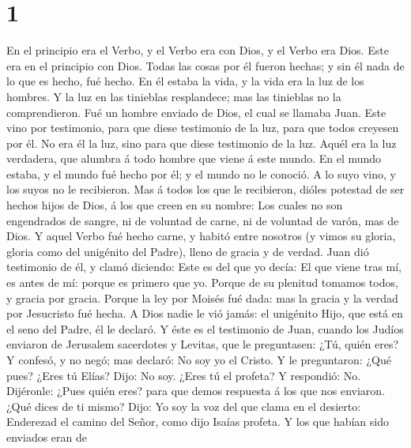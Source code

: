 \hypertarget{section}{%
\section{1}\label{section}}

 En el principio era el Verbo, y el Verbo era con Dios, y
el Verbo era Dios.  Este era en el principio con Dios.
 Todas las cosas por él fueron hechas; y sin él nada de lo
que es hecho, fué hecho.  En él estaba la vida, y la vida
era la luz de los hombres.  Y la luz en las tinieblas
resplandece; mas las tinieblas no la comprendieron.  Fué
un hombre enviado de Dios, el cual se llamaba Juan.  Este
vino por testimonio, para que diese testimonio de la luz, para que todos
creyesen por él.  No era él la luz, sino para que diese
testimonio de la luz.  Aquél era la luz verdadera, que
alumbra á todo hombre que viene á este mundo.  En el
mundo estaba, y el mundo fué hecho por él; y el mundo no le conoció.
 A lo suyo vino, y los suyos no le recibieron.
 Mas á todos los que le recibieron, dióles potestad de
ser hechos hijos de Dios, á los que creen en su nombre: 
Los cuales no son engendrados de sangre, ni de voluntad de carne, ni de
voluntad de varón, mas de Dios.  Y aquel Verbo fué hecho
carne, y habitó entre nosotros (y vimos su gloria, gloria como del
unigénito del Padre), lleno de gracia y de verdad.  Juan
dió testimonio de él, y clamó diciendo: Este es del que yo decía: El que
viene tras mí, es antes de mí: porque es primero que yo. 
Porque de su plenitud tomamos todos, y gracia por gracia.
 Porque la ley por Moisés fué dada: mas la gracia y la
verdad por Jesucristo fué hecha.  A Dios nadie le vió
jamás: el unigénito Hijo, que está en el seno del Padre, él le declaró.
 Y éste es el testimonio de Juan, cuando los Judíos
enviaron de Jerusalem sacerdotes y Levitas, que le preguntasen: ¿Tú,
quién eres?  Y confesó, y no negó; mas declaró: No soy yo
el Cristo.  Y le preguntaron: ¿Qué pues? ¿Eres tú Elías?
Dijo: No soy. ¿Eres tú el profeta? Y respondió: No.~
Dijéronle: ¿Pues quién eres? para que demos respuesta á los que nos
enviaron. ¿Qué dices de ti mismo?  Dijo: Yo soy la voz
del que clama en el desierto: Enderezad el camino del Señor, como dijo
Isaías profeta.  Y los que habían sido enviados eran de
